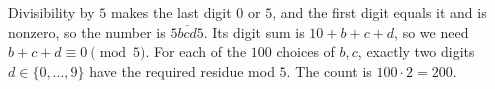 Divisibility by $5$ makes the last digit $0$ or $5$, and the first digit equals it and is nonzero, so the number is $\overline{5bcd5}$. Its digit sum is $10+b+c+d$, so we need $b+c+d\equiv0\pmod5$. For each of the $100$ choices of $b,c$, exactly two digits $d\in\{0,\dots,9\}$ have the required residue mod $5$. The count is $100\cdot2=\boxed{200}$.

